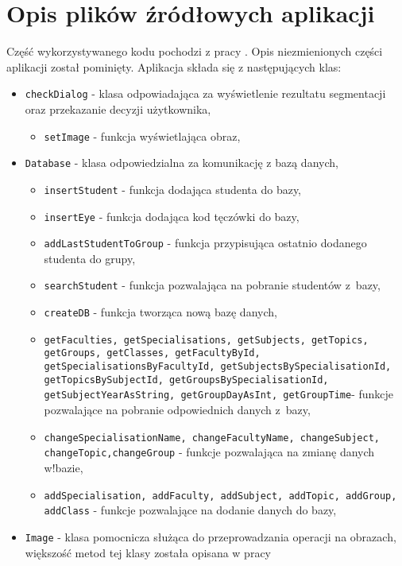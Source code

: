 \chapter{Opis plików źródłowych aplikacji}
\label{cha:opiskodow}

Część wykorzystywanego kodu pochodzi z pracy \cite{Gl11}. Opis niezmienionych części aplikacji został pominięty. Aplikacja składa się z następujących klas:
\begin{itemize}
\item \verb!checkDialog! - klasa odpowiadająca za wyświetlenie rezultatu segmentacji oraz przekazanie decyzji użytkownika,
\begin{itemize}
\item \verb!setImage! - funkcja wyświetlająca obraz,
\end{itemize}
\item \verb!Database! - klasa odpowiedzialna za komunikację z bazą danych,
\begin{itemize}
\item \verb!insertStudent! - funkcja dodająca studenta do bazy,
\item \verb!insertEye! - funkcja dodająca kod tęczówki do bazy,
\item \verb!addLastStudentToGroup! - funkcja przypisująca ostatnio dodanego studenta do grupy,
\item \verb!searchStudent! - funkcja pozwalająca na pobranie studentów z~bazy,
\item \verb!createDB! - funkcja tworząca nową bazę danych,
\item \verb!getFaculties, getSpecialisations, getSubjects, getTopics, getGroups, getClasses, getFacultyById, getSpecialisationsByFacultyId, getSubjectsBySpecialisationId, getTopicsBySubjectId, getGroupsBySpecialisationId, getSubjectYearAsString, getGroupDayAsInt, getGroupTime!- funkcje pozwalające na pobranie odpowiednich danych z~bazy,
\item \verb!changeSpecialisationName, changeFacultyName, changeSubject, changeTopic,changeGroup! - funkcje pozwalająca na zmianę danych w!bazie,
\item \verb!addSpecialisation, addFaculty, addSubject, addTopic, addGroup, addClass! - funkcje pozwalające na dodanie danych do bazy,
\end{itemize}
\item \verb!Image! - klasa pomocnicza służąca do przeprowadzania operacji na obrazach, większość metod tej klasy została opisana w pracy \cite{Gl11}
\begin{itemize}

\end{itemize}
\end{itemize}
